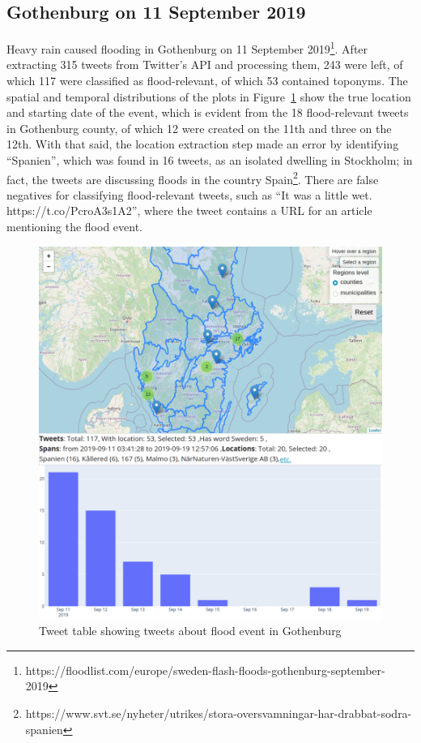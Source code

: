 \subsection{Gothenburg on 11 September 2019}

Heavy rain caused flooding in Gothenburg on 11 September
2019\footnote{https://floodlist.com/europe/sweden-flash-floods-gothenburg-september-2019}. After
extracting 315 tweets from Twitter's API and processing them, 243 were left, of which 117 were
classified as flood-relevant, of which 53 contained toponyms. The spatial and temporal distributions
of the plots in Figure~\ref{fig:gothenburg_map} show the true location and starting date of the
event, which is evident from the 18 flood-relevant tweets in Gothenburg county, of which 12 were
created on the 11th and three on the 12th. With that said, the location extraction step made an
error by identifying ``Spanien'', which was found in 16 tweets, as an isolated dwelling in
Stockholm; in fact, the tweets are discussing floods in the country
Spain\footnote{https://www.svt.se/nyheter/utrikes/stora-oversvamningar-har-drabbat-sodra-spanien}.
There are false negatives for classifying flood-relevant tweets, such as ``It was a little wet.
https://t.co/PcroA3s1A2'', where the tweet contains a \ac{URL} for an article mentioning the flood
event.

\begin{figure}[H]
  \begin{center}
    \includegraphics[width=12cm]{./images/gothenburg_floods.png}
  \end{center}
  \caption{Tweet table  showing tweets about flood event in Gothenburg}
  \label{fig:gothenburg_map}
\end{figure}

